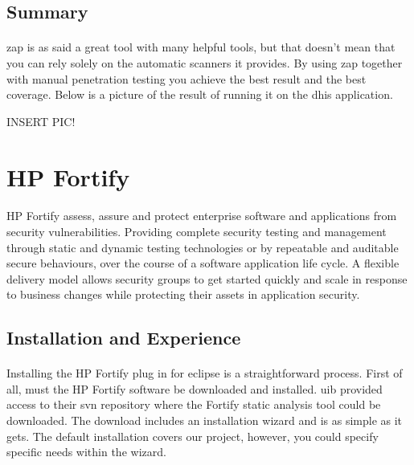 \documentclass[11pt,english,a4paper]{report}
\begin{document}
\subsection{Summary}
\paragraph{}
\gls{zap} is as said a great tool with many helpful tools, but that doesn't mean that you can rely solely on the automatic scanners it provides. 
By using \gls{zap} together with manual penetration testing you achieve the best result and the best coverage. 
Below is a picture of the result of running it on the \gls{dhis} application.

INSERT PIC!


\section{HP Fortify}
\paragraph{}
HP Fortify assess, assure and protect enterprise software and applications from security vulnerabilities.
Providing complete security testing and management through static and dynamic testing technologies or by repeatable and auditable secure behaviours, over the course of a software application life cycle. 
A flexible delivery model allows security groups to get started quickly and scale in response to business changes while protecting their assets in application security.  



\subsection{Installation and Experience}
\paragraph{}
Installing the HP Fortify plug in for eclipse is a straightforward process. 
First of all, must the HP Fortify software be downloaded and installed.
\gls{uib} provided access to their \gls{svn} repository where the Fortify static analysis tool could be downloaded.  
The download includes an installation wizard and is as simple as it gets. 
The default installation covers our project, however, you could specify specific needs within the wizard.
\end{document}
